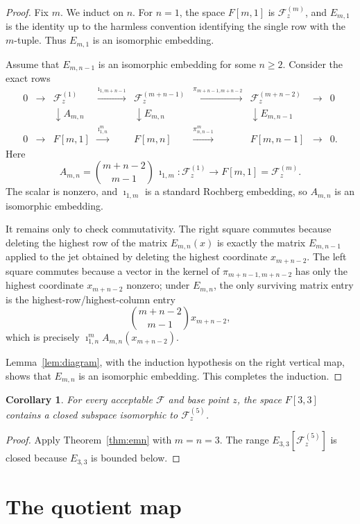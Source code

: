 \documentclass[11pt]{article}
\newtheorem{corollary}{Corollary}
\newcommand{\F}{\mathscr F}
\newcommand{\To}{\longrightarrow}
\begin{document}
\begin{proof}
Fix \(m\).  We induct on \(n\).  For \(n=1\), the space \(F[m,1]\) is \(\F_z^{(m)}\), and \(E_{m,1}\) is the identity up to the harmless convention identifying the single row with the \(m\)-tuple.  Thus \(E_{m,1}\) is an isomorphic embedding.

Assume that \(E_{m,n-1}\) is an isomorphic embedding for some \(n\ge2\).  Consider the exact rows
\[
\begin{array}{ccccccccc}
0&\To&\F_z^{(1)}
&\xrightarrow{\imath_{1,m+n-1}}&
\F_z^{(m+n-1)}
&\xrightarrow{\pi_{m+n-1,m+n-2}}&
\F_z^{(m+n-2)}
&\To&0\\
&&\downarrow A_{m,n}&&\downarrow E_{m,n}&&\downarrow E_{m,n-1}\\
0&\To&F[m,1]
&\xrightarrow{\imath^m_{1,n}}&
F[m,n]
&\xrightarrow{\pi^m_{n,n-1}}&
F[m,n-1]
&\To&0 .
\end{array}
\]
Here
\[
  A_{m,n}
  = \binom{m+n-2}{m-1}\,\imath_{1,m}:\F_z^{(1)}\To F[m,1]=\F_z^{(m)}.
\]
The scalar is nonzero, and \(\imath_{1,m}\) is a standard Rochberg embedding, so \(A_{m,n}\) is an isomorphic embedding.

It remains only to check commutativity.  The right square commutes because deleting the highest row of the matrix \(E_{m,n}(x)\) is exactly the matrix \(E_{m,n-1}\) applied to the jet obtained by deleting the highest coordinate \(x_{m+n-2}\).  The left square commutes because a vector in the kernel of
\(\pi_{m+n-1,m+n-2}\) has only the highest coordinate \(x_{m+n-2}\) nonzero; under \(E_{m,n}\), the only surviving matrix entry is the highest-row/highest-column entry
\[
  \binom{m+n-2}{m-1}x_{m+n-2},
\]
which is precisely \(\imath^m_{1,n}A_{m,n}(x_{m+n-2})\).

Lemma~\ref{lem:diagram}, with the induction hypothesis on the right vertical map, shows that \(E_{m,n}\) is an isomorphic embedding.  This completes the induction.
\end{proof}

\begin{corollary}
For every acceptable \(\F\) and base point \(z\), the space \(F[3,3]\) contains a closed subspace isomorphic to \(\F_z^{(5)}\).
\end{corollary}

\begin{proof}
Apply Theorem~\ref{thm:emn} with \(m=n=3\).  The range \(E_{3,3}[\F_z^{(5)}]\) is closed because \(E_{3,3}\) is bounded below.
\end{proof}

\section*{The quotient map}
\end{document}
